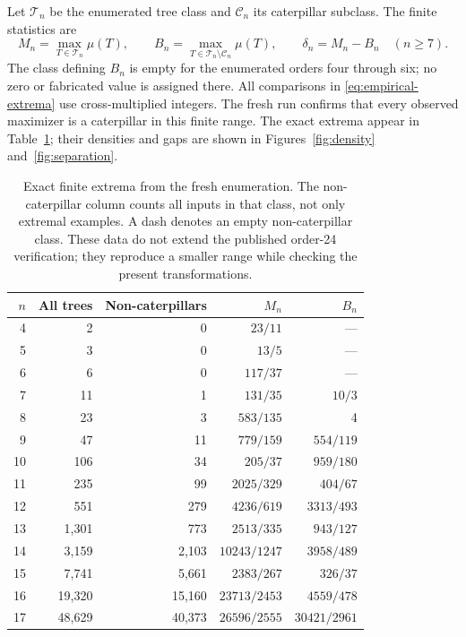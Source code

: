 \documentclass[11pt,reqno]{amsart}
\renewcommand{\arraystretch}{1.12}
\theoremstyle{plain}
\begin{document}
Let $\mathcal T_n$ be the enumerated tree class and $\mathcal C_n$ its caterpillar
subclass. The finite statistics are
\[
 M_n=\max_{T\in\mathcal T_n}\mu(T),\qquad
 B_n=\max_{T\in\mathcal T_n\setminus\mathcal C_n}\mu(T),\qquad
 \delta_n=M_n-B_n\quad(n\ge7).
 \tag{6.1}\label{eq:empirical-extrema}
\]
The class defining $B_n$ is empty for the enumerated orders four through six;
no zero or fabricated value is assigned there. All comparisons in
\eqref{eq:empirical-extrema} use cross-multiplied integers. The fresh run confirms
that every observed maximizer is a caterpillar in this finite range.
The exact extrema appear in Table~\ref{tab:extrema}; their densities and gaps
are shown in Figures~\ref{fig:density} and~\ref{fig:separation}.

\begin{table}[tbp]
\caption{Exact finite extrema from the fresh enumeration. The non-caterpillar
column counts all inputs in that class, not only extremal examples.
A dash denotes an empty non-caterpillar class. These data do not extend the
published order-24 verification; they reproduce a smaller range while checking
the present transformations.}
\label{tab:extrema}\centering\small
\setlength{\tabcolsep}{10pt}
\renewcommand{\arraystretch}{1.30}
\begin{tabular}{@{}rrrrr@{}}
\toprule
$n$ & All trees & Non-caterpillars & $M_n$ & $B_n$ \\
\midrule
4 & 2 & 0 & $23/11$ & --- \\
5 & 3 & 0 & $13/5$ & --- \\
6 & 6 & 0 & $117/37$ & --- \\
7 & 11 & 1 & $131/35$ & $10/3$ \\
8 & 23 & 3 & $583/135$ & 4 \\
9 & 47 & 11 & $779/159$ & $554/119$ \\
10 & 106 & 34 & $205/37$ & $959/180$ \\
11 & 235 & 99 & $2025/329$ & $404/67$ \\
12 & 551 & 279 & $4236/619$ & $3313/493$ \\
13 & 1,301 & 773 & $2513/335$ & $943/127$ \\
14 & 3,159 & 2,103 & $10243/1247$ & $3958/489$ \\
15 & 7,741 & 5,661 & $2383/267$ & $326/37$ \\
16 & 19,320 & 15,160 & $23713/2453$ & $4559/478$ \\
17 & 48,629 & 40,373 & $26596/2555$ & $30421/2961$ \\
\bottomrule
\end{tabular}
\end{table}
\end{document}
